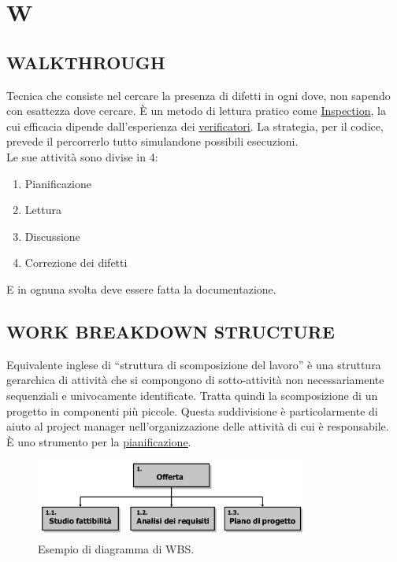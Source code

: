 \newpage
	\section{W} \label{sec:W}
		\subsection{WALKTHROUGH}  \label{walkthrough} %
		Tecnica che consiste nel cercare la presenza di difetti in ogni dove, non sapendo con esattezza dove cercare. È un metodo di lettura pratico come \underline{\hyperref[inspection]{Inspection}}, la cui efficacia dipende dall'esperienza dei \underline{\hyperref[verificatore]{verificatori}}. La strategia, per il codice, prevede il percorrerlo tutto simulandone possibili esecuzioni. \\
		Le sue attività sono divise in 4:
		\begin{enumerate}
			\item Pianificazione
			\item Lettura
			\item Discussione
			\item Correzione dei difetti
		\end{enumerate}
		E in ognuna svolta deve essere fatta la documentazione.


		\subsection{WORK BREAKDOWN STRUCTURE}  \label{wbs}
		Equivalente inglese di ``struttura di scomposizione del lavoro'' è una struttura gerarchica di attività che si compongono di sotto-attività non necessariamente sequenziali e univocamente identificate. Tratta quindi la scomposizione di un progetto in componenti più piccole. Questa suddivisione è particolarmente di aiuto al project manager nell'organizzazione delle attività di cui è responsabile. \\
		È uno strumento per la \underline{\hyperref[pianificazione]{pianificazione}}.

		\begin{figure}[H]
			\centering
			\includegraphics[width=0.8\textwidth]{img/wbs}
			\caption{Esempio di diagramma di WBS.}
		\end{figure}
